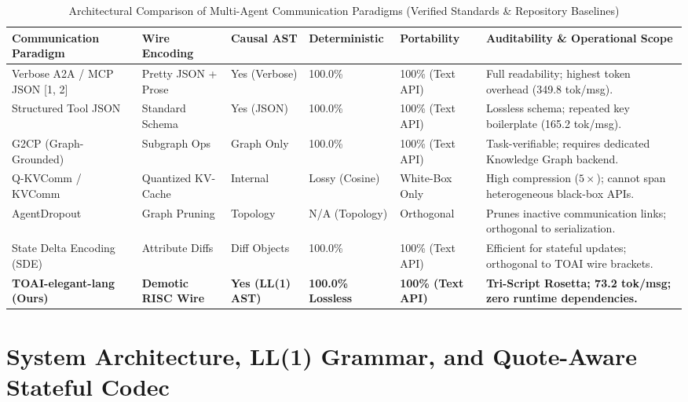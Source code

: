 \documentclass[9pt,a4paper]{extarticle}
\begin{document}
\begin{table}[h!]
\centering
\caption{Architectural Comparison of Multi-Agent Communication Paradigms (Verified Standards \& Repository Baselines)}
\label{tab:arch_comparison}
\footnotesize
\renewcommand{\arraystretch}{0.98}
\setlength{\tabcolsep}{2.5pt}
\begin{tabularx}{\textwidth}{L{3.2cm} L{2.2cm} C{1.6cm} C{1.8cm} C{1.8cm} Y}
\toprule
{}
\textbf{\color{white}Communication Paradigm} &
\textbf{\color{white}Wire Encoding} &
\textbf{\color{white}Causal AST} &
\textbf{\color{white}Deterministic} &
\textbf{\color{white}Portability} &
\textbf{\color{white}Auditability \& Operational Scope} \\
\midrule
Verbose A2A / MCP JSON [1, 2] & Pretty JSON + Prose & Yes (Verbose) & 100.0\% & 100\% (Text API) & Full readability; highest token overhead (349.8 tok/msg). \\
Structured Tool JSON & Standard Schema & Yes (JSON) & 100.0\% & 100\% (Text API) & Lossless schema; repeated key boilerplate (165.2 tok/msg). \\
G2CP (Graph-Grounded) & Subgraph Ops & Graph Only & 100.0\% & 100\% (Text API) & Task-verifiable; requires dedicated Knowledge Graph backend. \\
Q-KVComm / KVComm & Quantized KV-Cache & Internal & Lossy (Cosine) & White-Box Only & High compression ($5\times$); cannot span heterogeneous black-box APIs. \\
AgentDropout & Graph Pruning & Topology & N/A (Topology) & Orthogonal & Prunes inactive communication links; orthogonal to serialization. \\
State Delta Encoding (SDE) & Attribute Diffs & Diff Objects & 100.0\% & 100\% (Text API) & Efficient for stateful updates; orthogonal to TOAI wire brackets. \\
\textbf{TOAI-elegant-lang (Ours)} & \textbf{Demotic RISC Wire} & \textbf{Yes (LL(1) AST)} & \textbf{100.0\% Lossless} & \textbf{100\% (Text API)} & \textbf{Tri-Script Rosetta; 73.2 tok/msg; zero runtime dependencies.} \\
\bottomrule
\end{tabularx}
\end{table}

\section{System Architecture, LL(1) Grammar, and Quote-Aware Stateful Codec}
\end{document}
